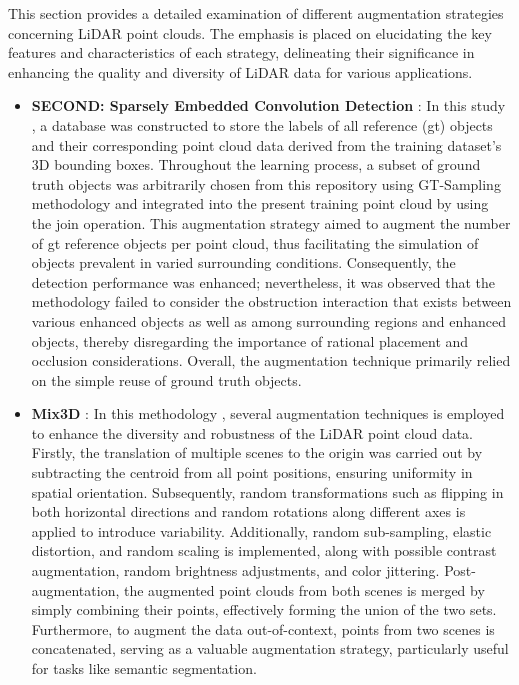 This section provides a detailed examination of different augmentation strategies concerning LiDAR point clouds. The emphasis is placed on elucidating the key features and characteristics of each strategy, delineating their significance in enhancing the quality and diversity of LiDAR data for various applications. 
\begin{itemize}
    \item \textbf{SECOND: Sparsely Embedded Convolution Detection} : In this study \parencite{second2018}, a database was constructed to store the labels of all reference (\acrshort{gt}) objects and their corresponding point cloud data derived from the training dataset's 3D bounding boxes. Throughout the learning process, a subset of ground truth objects was arbitrarily chosen from this repository using GT-Sampling methodology and integrated into the present training point cloud by using the join operation. This augmentation strategy aimed to augment the number of \acrshort{gt} reference objects per point cloud, thus facilitating the simulation of objects prevalent in varied surrounding conditions. Consequently, the detection performance was enhanced; nevertheless, it was observed that the methodology failed to consider the obstruction interaction that exists between various enhanced objects as well as among surrounding regions and enhanced objects, thereby disregarding the importance of rational placement and occlusion considerations. Overall, the augmentation technique primarily relied on the simple reuse of ground truth objects.
    \item \textbf{Mix3D} : In this methodology \parencite{mix3d2021}, several augmentation techniques is employed to enhance the diversity and robustness of the LiDAR point cloud data. Firstly, the translation of multiple scenes to the origin was carried out by subtracting the centroid from all point positions, ensuring uniformity in spatial orientation. Subsequently, random transformations such as flipping in both horizontal directions and random rotations along different axes is applied to introduce variability. Additionally, random sub-sampling, elastic distortion, and random scaling is implemented, along with possible contrast augmentation, random brightness adjustments, and color jittering. Post-augmentation, the augmented point clouds from both scenes is merged by simply combining their points, effectively forming the union of the two sets. Furthermore, to augment the data out-of-context, points from two scenes is concatenated, serving as a valuable augmentation strategy, particularly useful for tasks like semantic segmentation.

\end{itemize}

